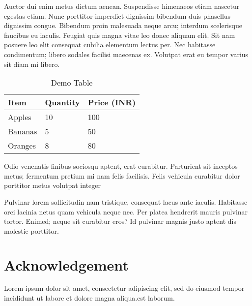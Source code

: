 \documentclass[final,3p,times,twocolumn]{elsarticle}
\begin{document}
Auctor dui enim metus dictum aenean. Suspendisse himenaeos etiam nascetur egestas etiam. Nunc porttitor imperdiet dignissim bibendum duis phasellus dignissim congue. Bibendum proin malesuada neque arcu; interdum scelerisque faucibus eu iaculis. Feugiat quis magna vitae leo donec aliquam elit. Sit nam posuere leo elit consequat cubilia elementum lectus per. Nec habitasse condimentum; libero sodales facilisi maecenas ex. Volutpat erat eu tempor varius sit diam mi libero.

\begin{table}[h]
    \centering
    \caption{Demo Table}
    \begin{tabular}{@{}lll@{}}
        \toprule
        \textbf{Item} & \textbf{Quantity} & \textbf{Price (INR)} \\ \midrule
        Apples        & 10                & 100                  \\
        Bananas       & 5                 & 50                   \\
        Oranges       & 8                 & 80                   \\ \bottomrule
    \end{tabular}
\end{table}


Odio venenatis finibus sociosqu aptent, erat curabitur. Parturient sit inceptos metus; fermentum pretium mi nam felis facilisis. Felis vehicula curabitur dolor porttitor metus volutpat integer

Pulvinar lorem sollicitudin nam tristique, consequat lacus ante iaculis. Habitasse orci lacinia netus quam vehicula neque nec. Per platea hendrerit mauris pulvinar tortor. Enimed; neque sit curabitur eros? Id pulvinar magnis justo aptent dis molestie porttitor.

\section{Acknowledgement}

Lorem ipsum dolor sit amet, consectetur adipiscing elit, sed do eiusmod tempor incididunt ut labore et dolore magna aliqua.est laborum.

\end{document}

